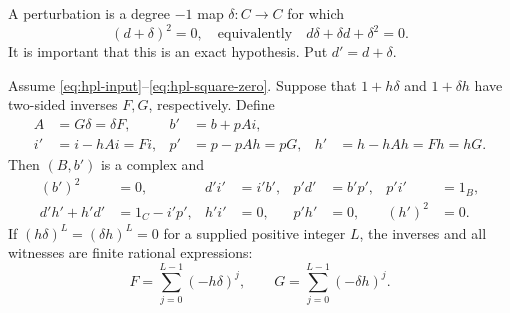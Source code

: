 A perturbation is a degree $-1$ map $\delta:C\to C$ for which
\begin{equation}
 (d+\delta)^2=0,
 \quad\text{equivalently}\quad d\delta+\delta d+\delta^2=0.
 \label{eq:hpl-square-zero}
\end{equation}
It is important that this is an exact hypothesis.  Put $d'=d+\delta$.

\begin{theorem}
\label{thm:hpl-exact}
Assume \eqref{eq:hpl-input}--\eqref{eq:hpl-square-zero}.  Suppose that
$1+h\delta$ and $1+\delta h$ have two-sided inverses $F,G$, respectively.
Define
\begin{align}
 A&=G\delta=\delta F,&
 b'&=b+pAi,\\
 i'&=i-hAi=Fi,&
 p'&=p-pAh=pG,&
 h'&=h-hAh=Fh=hG.
 \label{eq:hpl-transferred}
\end{align}
Then $(B,b')$ is a complex and
\begin{align}
 (b')^2&=0,& d'i'&=i'b',&p'd'&=b'p',&p'i'&=1_B,\\
 d'h'+h'd'&=1_C-i'p',&h'i'&=0,&p'h'&=0,&(h')^2&=0.
 \label{eq:hpl-output}
\end{align}
If $(h\delta)^L=(\delta h)^L=0$ for a supplied positive integer $L$, the
inverses and all witnesses are finite rational expressions:
\[
 F=\sum_{j=0}^{L-1}(-h\delta)^j,
 \qquad G=\sum_{j=0}^{L-1}(-\delta h)^j.
\]
\end{theorem}

